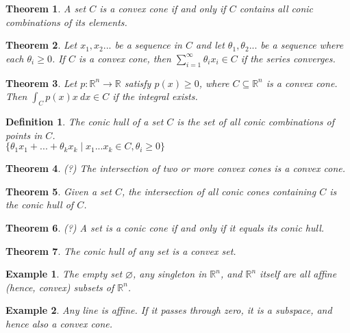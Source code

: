 \documentclass[a4paper]{article}
\newtheorem{mytheorem}{Theorem}
\newtheorem{example}{Example}
\newtheorem{mydef}{Definition}
\numberwithin{mytheorem}{section}
\numberwithin{mydef}{section}
\numberwithin{example}{section}
\begin{document}
\begin{mytheorem} A set $C$ is a convex cone if and only if $C$ contains all conic combinations of its elements. \end{mytheorem}

\begin{mytheorem} Let $x_{1},x_{2}...$ be a sequence in $C$ and let $\theta_{1},\theta_{2}...$ be a sequence where each $\theta_{i} \geq 0$. If $C$ is a convex cone, then $\sum_{i = 1}^{\infty} \theta_{i}x_{i} \in C $ if the series converges. \end{mytheorem}

\begin{mytheorem} Let $p : \mathbb{R}^{n} \rightarrow \mathbb{R} $ satisfy $p(x) \geq 0$, where $C \subseteq \mathbb{R}^{n}$ is a convex cone. Then $\int_{C}p(x)x \ dx \in C $ if the integral exists. \end{mytheorem}

\begin{mydef} The conic hull of a set $C$ is the set of all conic combinations of points in $C$. \\
$\{ \theta_{1}x_{1} + ... + \theta_{k}x_{k} \mid x_{1}...x_{k} \in C, \theta_{i} \geq 0  \}$ \end{mydef}

\begin{mytheorem} (?) The intersection of two or more convex cones is a convex cone. \end{mytheorem}

\begin{mytheorem} Given a set $C$, the intersection of all conic cones containing $C$ is the conic hull of $C$. \end{mytheorem}

\begin{mytheorem} (?) A set is a conic cone if and only if it equals its conic hull. \end{mytheorem}

\begin{mytheorem} The conic hull of any set is a convex set. \end{mytheorem}

\begin{example} The empty set $\varnothing$, any singleton in $\mathbb{R}^{n}$, and $\mathbb{R}^{n}$ itself are all affine (hence, convex) subsets of $\mathbb{R}^{n}$.
\end{example}

\begin{example} Any line is affine. If it passes through zero, it is a subspace, and hence also a convex cone.
\end{example}
\end{document}
